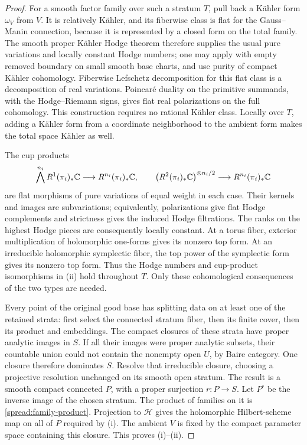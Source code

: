 \begin{proof}
For a smooth factor family over such a stratum \(T\), pull back a
K\"ahler form \(\omega_V\) from \(V\).  It is relatively K\"ahler,
and its fiberwise class is flat for the Gauss--Manin connection,
because it is represented by a closed form on the total family.
The smooth proper K\"ahler Hodge theorem therefore supplies the
usual pure variations and locally constant Hodge numbers; one may
apply \cite[Theorem~1.1(i)]{FF25} with empty removed boundary on
small smooth base charts, and use purity of compact K\"ahler cohomology.
Fiberwise Lefschetz decomposition for this flat class is a
decomposition of real variations.  Poincar\'e duality on the
primitive summands, with the Hodge--Riemann signs, gives flat real
polarizations on the full cohomology.  This construction requires
no rational K\"ahler class.  Locally over \(T\), adding a K\"ahler
form from a coordinate neighborhood to the ambient form makes
the total space K\"ahler as well.

The cup products
\[
 \bigwedge^{n_i}R^1(\pi_i)_*\mathbb C
      \longrightarrow R^{n_i}(\pi_i)_*\mathbb C,
 \qquad
 \bigl(R^2(\pi_i)_*\mathbb C\bigr)^{\otimes n_i/2}
      \longrightarrow R^{n_i}(\pi_i)_*\mathbb C
\]
are flat morphisms of pure variations of equal weight in each case.
Their kernels and images are subvariations; equivalently,
polarizations give flat Hodge complements and strictness gives
the induced Hodge filtrations.  The ranks on the highest Hodge
pieces are consequently locally constant.  At a torus fiber,
exterior multiplication of holomorphic one-forms gives its
nonzero top form.  At an irreducible holomorphic symplectic fiber,
the top power of the symplectic form gives its nonzero top form.
Thus the Hodge numbers and cup-product isomorphisms in (ii)
hold throughout \(T\).  Only these cohomological consequences of
the two types are needed.

Every point of the original good base has splitting data on at
least one of the retained strata: first select the connected
stratum fiber, then its finite cover, then its product and
embeddings.  The compact closures of these strata have proper
analytic images in \(S\).  If all their images were proper analytic
subsets, their countable union could not contain the nonempty open
\(U\), by Baire category.  One closure therefore dominates \(S\).
Resolve that irreducible closure, choosing a projective resolution
unchanged on its smooth open stratum.  The result is a smooth
compact connected \(P\), with a proper surjection \(r:P\to S\).
Let \(P^\circ\) be the inverse image of the chosen stratum.
The product of families on it is
\eqref{spread:family-product}.  Projection to \(\mathscr H\) gives
the holomorphic Hilbert-scheme map on all of \(P\) required by (i).
The ambient \(V\) is fixed by the compact parameter space containing
this closure.  This proves (i)--(ii).


\end{proof}

